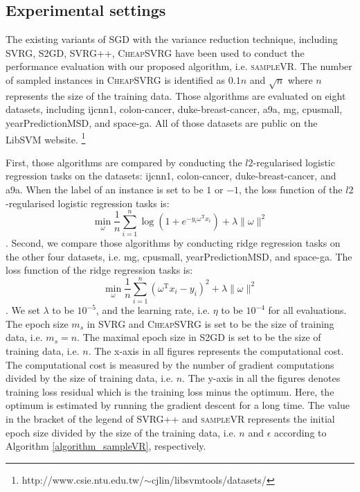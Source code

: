 \documentclass[letterpaper]{article}
\begin{document}
\subsection{Experimental settings}
\label{sect_experimental_settings}
The existing variants of SGD with the variance reduction technique, including SVRG, S2GD, SVRG++, \textsc{CheapSVRG} have been used to conduct the performance evaluation with our proposed algorithm, i.e. \textsc{sampleVR}. The number of sampled instances in \textsc{CheapSVRG} is identified as $0.1n$ and $\sqrt{n}$ where $n$ represents the size of the training data.
Those algorithms are evaluated on eight datasets, including ijcnn1, colon-cancer, duke-breast-cancer, a9a, mg, cpusmall, yearPredictionMSD, and space-ga. All of those datasets are public on the LibSVM website. \footnote{http://www.csie.ntu.edu.tw/$\sim$cjlin/libsvmtools/datasets/} 

First, those algorithms are compared by conducting the $l2$-regularised logistic regression tasks on the datasets: ijcnn1, colon-cancer, duke-breast-cancer, and a9a. When the label of an instance is set to be $1$ or $-1$, the loss function of the $l2$-regularised logistic regression tasks is:
$$
\min\limits_\omega \frac{1}{n}\sum\limits_{i=1}^n \log(1+e^{-y_i \omega^\mathrm{T} x_i }) + \lambda \parallel \omega \parallel^2
$$. Second, we compare those algorithms by conducting ridge regression tasks on the other four datasets, i.e. mg, cpusmall, yearPredictionMSD, and space-ga. The loss function of the ridge regression tasks is:
$$
\min\limits_\omega \frac{1}{n}\sum\limits_{i=1}^n\left(\omega^{\mathrm{T}}x_i-y_i\right)^2 + \lambda \parallel \omega \parallel^2
$$. We set $\lambda$ to be $10^{-5}$, and the learning rate, i.e. $\eta$ to be $10^{-4}$ for all evaluations.  The epoch size $m_s$ in SVRG and \textsc{CheapSVRG} is set to be the size of training data, i.e. $m_s\mathrm{=}n$. The maximal epoch size in S2GD is set to be the size of training data, i.e. $n$.    The x-axis in all  figures represents the computational cost. The computational cost is measured by the number of gradient computations divided by  the size of training data, i.e. $n$. The y-axis in all the figures denotes training loss residual which is the training loss minus the optimum. Here, the optimum is estimated by running the gradient descent for a long time. The value in the bracket of the legend of SVRG++ and \textsc{sampleVR} represents the initial epoch size divided by the size of the training data, i.e. $n$ and $\epsilon$ according to Algorithm \ref{algorithm_sampleVR}, respectively.
\end{document}
